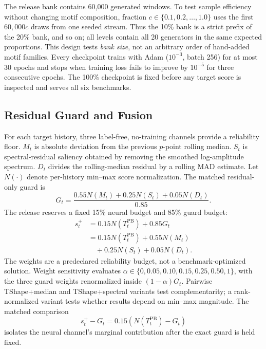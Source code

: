 \documentclass[conference]{IEEEtran}
\begin{document}
The release bank contains 60,000 generated windows. To test sample efficiency without changing motif composition, fraction $c\in\{0.1,0.2,\ldots,1.0\}$ uses the first $60{,}000c$ draws from one seeded stream. Thus the 10\% bank is a strict prefix of the 20\% bank, and so on; all levels contain all 20 generators in the same expected proportions. This design tests \emph{bank size}, not an arbitrary order of hand-added motif families. Every checkpoint trains with Adam ($10^{-3}$, batch 256) for at most 30 epochs and stops when training loss fails to improve by $10^{-5}$ for three consecutive epochs. The 100\% checkpoint is fixed before any target score is inspected and serves all six benchmarks.

\subsection{Residual Guard and Fusion}

For each target history, three label-free, no-training channels provide a reliability floor. $M_t$ is absolute deviation from the previous $p$-point rolling median. $S_t$ is spectral-residual saliency obtained by removing the smoothed log-amplitude spectrum. $D_t$ divides the rolling-median residual by a rolling MAD estimate. Let $N(\cdot)$ denote per-history min--max score normalization. The matched residual-only guard is
\begin{equation}
 G_t=\frac{0.55N(M_t)+0.25N(S_t)+0.05N(D_t)}{0.85}.
 \label{eq:guard}
\end{equation}
The release reserves a fixed 15\% neural budget and 85\% guard budget:
\begin{equation}
 \begin{aligned}
 s_t^{+} &=0.15N(T_t^{\mathrm{PB}})+0.85G_t \\
 &=0.15N(T_t^{\mathrm{PB}})+0.55N(M_t) \\
 &\quad+0.25N(S_t)+0.05N(D_t).
 \end{aligned}
 \label{eq:fusion}
\end{equation}
The weights are a predeclared reliability budget, not a benchmark-optimized solution. Weight sensitivity evaluates $\alpha\in\{0,0.05,0.10,0.15,0.25,0.50,1\}$, with the three guard weights renormalized inside $(1-\alpha)G_t$. Pairwise TShape+median and TShape+spectral variants test complementarity; a rank-normalized variant tests whether results depend on min--max magnitude. The matched comparison
\begin{equation}
 s_t^{+}-G_t=0.15\left(N(T_t^{\mathrm{PB}})-G_t\right)
 \label{eq:marginal}
\end{equation}
isolates the neural channel's marginal contribution after the exact guard is held fixed.
\end{document}
